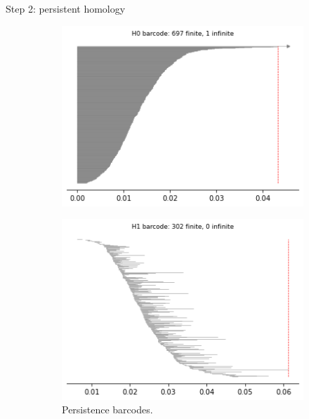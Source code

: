 \documentclass[xcolor={dvipsnames,svgnames}]{beamer}
\begin{document}
\begin{frame}{Step 2: persistent homology}
\begin{figure}[H]
\begin{subfigure}[b]{0.25\textwidth}
\end{subfigure}
\begin{subfigure}[b]{0.2\textwidth}
    \includegraphics[width=\textwidth]{figures/X1_H0_barcode.png}
    \caption{}
\end{subfigure}
\begin{subfigure}[b]{0.2\textwidth}
    \includegraphics[width=\textwidth]{figures/X1_H1_barcode.png}
        \caption{Persistence barcodes.}
\end{subfigure}
\begin{subfigure}[b]{0.2\textwidth}

\end{subfigure}
\end{figure}
\end{frame}
\end{document}
